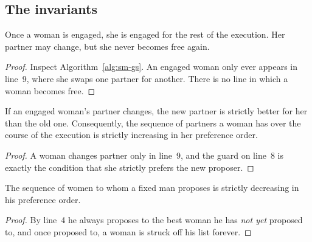 \subsection{The invariants}

\begin{observation}\label{obs:sm-1}
Once a woman is engaged, she is engaged for the rest of the execution.
Her partner may change, but she never becomes free again.
\end{observation}

\begin{proof}
Inspect Algorithm~\ref{alg:sm-gs}. An engaged woman only ever appears in
line~9, where she swaps one partner for another. There is no line in which a
woman becomes free.
\end{proof}

\begin{observation}\label{obs:sm-2}
If an engaged woman's partner changes, the new partner is strictly better for
her than the old one. Consequently, the sequence of partners a woman has over
the course of the execution is strictly increasing in her preference order.
\end{observation}

\begin{proof}
A woman changes partner only in line~9, and the guard on line~8 is exactly the
condition that she strictly prefers the new proposer.
\end{proof}

\begin{observation}\label{obs:sm-3}
The sequence of women to whom a fixed man proposes is strictly decreasing in
his preference order.
\end{observation}

\begin{proof}
By line~4 he always proposes to the best woman he has \emph{not yet} proposed
to, and once proposed to, a woman is struck off his list forever.
\end{proof}


